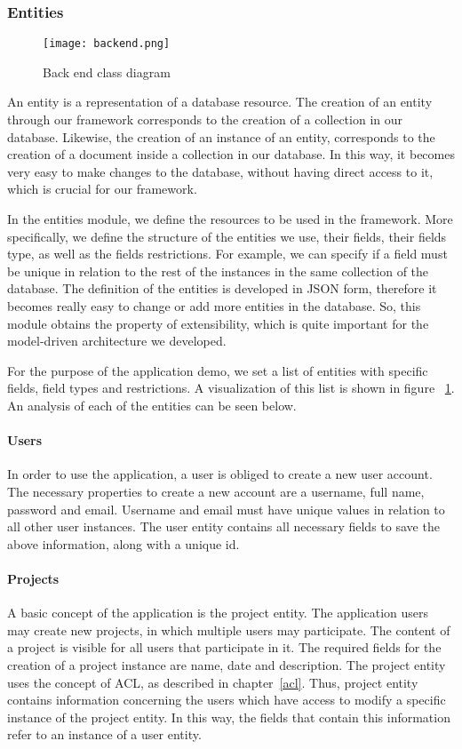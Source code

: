 \subsubsection{Entities}
\label{entities}
\begin{figure}
	\centerline{\texttt{[image: backend.png]}}
	\caption{Back end class diagram}
	\label{backend}
\end{figure}
An entity is a representation of a database resource. The creation of an entity through our framework corresponds to the creation of a collection in our database. Likewise, the creation of an instance of an entity, corresponds to the creation of a document inside a collection in our database. In this way, it becomes very easy to make changes to the database, without having direct access to it, which is crucial for our framework.\par
	In the entities module, we define the resources to be used in the framework. More specifically, we define the structure of the entities we use, their fields, their fields type, as well as the fields restrictions. For example, we can specify if a field must be unique in relation to the rest of the instances in the same collection of the database. The definition of the entities is developed in JSON form, therefore it becomes really easy to change or add more entities in the database. So, this module obtains the property of extensibility, which is quite important for the model-driven architecture we developed. \par 
	For the purpose of the application demo, we set a list of entities with specific fields, field types and restrictions. A visualization of this list is shown in figure ~\ref{backend}. An analysis of each of the entities can be seen below.\par
	
	 
\paragraph{Users}
In order to use the application, a user is obliged to create a new user account. The necessary properties to create a new account are a username, full name, password and email. Username and email must have unique values in relation to all other user instances. The user entity  contains all necessary fields to save the above information, along with a unique id.
\paragraph{Projects}
A basic concept of the application is the project entity. The application users may create new projects, in which multiple users may participate. The content of a project is visible for all users that participate in it. The required fields for the creation of a project instance are name, date and description. The project entity uses the concept of ACL, as described in chapter~\ref{acl}. Thus, project entity contains information concerning the users which have access to modify a specific instance of the project entity. In this way, the fields that contain this information refer to an instance of a user entity.
